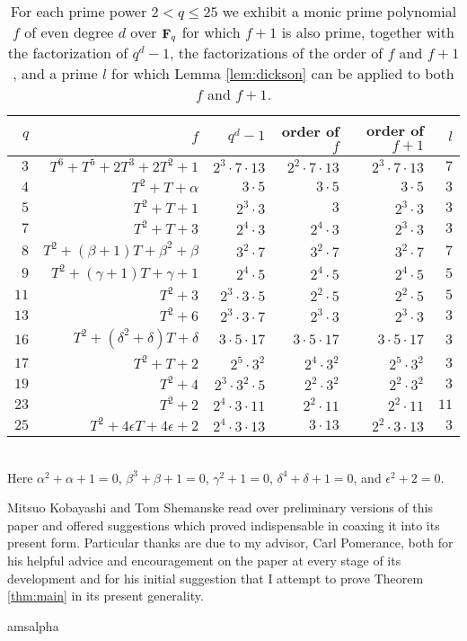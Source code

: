 \documentclass[a4paper]{compositio}
\begin{document}
\begin{table} \caption{\label{tbl:smalltwins2} For each prime power $2 < q \leq 25$
we exhibit a monic prime polynomial $f$ of even degree $d$ over
$\mathbf{F}_q$ for which $f+1$ is also prime, together with the
factorization of $q^d-1$, the factorizations of the order of $f$ and
$f+1$, and a prime $l$ for which Lemma \ref{lem:dickson} can be
applied to both $f$ and $f+1$.} \small \centering
\begin{tabular}{r|r|r|r|r|r} $q$ & $f$ &\textbf{$q^d-1$} &
\textbf{order of $f$} & \textbf{order of $f+1$} &
\textbf{$l$}\\\hline\hline\rule{0pt}{9pt} $3$ &
$T^6+T^5+2T^3+2T^2+1$ & $2^3\cdot 7 \cdot 13$ & $2^2 \cdot 7\cdot 13$ & $2^3\cdot 7 \cdot 13$ & $7$\\
$4$ & $T^2+T + \alpha$ & $3\cdot 5$ & $3\cdot 5$ & $3 \cdot 5$ & $3$\\
$5$ & $T^2+T+1$ & $2^3 \cdot 3$ & $3$ & $2^3\cdot 3$ &$3$ \\
$7$ & $T^2 + T + 3$ & $2^4\cdot 3$ & $2^4\cdot 3$ & $2^3
\cdot 3$ & $3$ \\
$8$ & $T^2+(\beta+1)T+\beta^2+\beta$ & $3^2\cdot 7$ & $3^2\cdot 7$ & $3^2\cdot 7$ & $7$ \\
$9$ & $T^2+(\gamma+1)T + \gamma+1$ & $2^4 \cdot 5$ & $2^4 \cdot 5$ & $2^4\cdot 5$ & $5$ \\
$11$ & $T^2 + 3$ & $2^3\cdot 3\cdot 5$ & $2^2\cdot 5$ & $2^2\cdot 5$ & $5$ \\
$13$ & $T^2 + 6$ & $2^3\cdot 3 \cdot 7$ & $2^3\cdot 3$ & $2^3\cdot 3$ & $3$\\
$16$ & $T^2+ (\delta^2+\delta)T + \delta$ & $3 \cdot 5 \cdot 17$ & $3\cdot 5  \cdot 17$ & $3\cdot 5 \cdot 17$ & $3$\\
$17$ & $T^2+T+2$ & $2^5\cdot 3^2$ & $2^4\cdot 3^2$ & $2^5 \cdot 3^2$ & $3$\\
$19$ & $T^2+4$ & $2^3\cdot 3^2 \cdot 5$ & $2^2\cdot 3^2$ & $2^2\cdot 3^2$ & $3$\\
$23$ & $T^2+2$ & $2^4 \cdot 3 \cdot 11$ & $2^2\cdot 11$ & $2^2\cdot 11$ & $11$\\
$25$ & $T^2 + 4\epsilon T + 4\epsilon + 2$ & $2^4\cdot 3\cdot 13$ &
$3\cdot 13$ & $2^2\cdot 3\cdot 13$ & $3$\\
\end{tabular}
\\\vskip 2pt
Here $\alpha^2+\alpha+1=0$, $\beta^3+\beta+1 =0$, $\gamma^2+1=0$,
$\delta^4 + \delta + 1 =0$, and $\epsilon^2 + 2=0$.
\end{table}

\begin{acknowledgements}
Mitsuo Kobayashi and Tom Shemanske read over preliminary versions of
this paper and offered suggestions which proved indispensable in
coaxing it into its present form. Particular thanks are due to my
advisor, Carl Pomerance, both for his helpful advice and
encouragement on the paper at every stage of its development and for
his initial suggestion that I attempt to prove Theorem
\ref{thm:main} in its present generality.\end{acknowledgements}
 {amsalpha}

\end{document}
